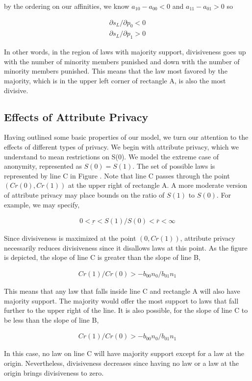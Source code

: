 by the ordering on our affinities, we know $a_{10} - a_{00}  < 0$ and $a_{11} - a_{01} > 0$ so

\begin{align}
\partial s_L / \partial p_0 <0 \\
\partial s_L / \partial p_1 >0
\end{align}

In other words, in the region of laws with majority support, divisiveness goes up with the number of minority members punished and down with the number of minority members punished.  This means that the law most favored by the majority, which is in the upper left corner of rectangle A, is also the most divisive.

\subsection{Effects of Attribute Privacy}

Having outlined some basic properties of our model, we turn our attention to the effects of different types of privacy.  We begin with attribute privacy, which we understand to mean restrictions on S(0).  We model the extreme case of anonymity, represented as $S(0) = S(1)$.  The set of possible laws is represented by line C in Figure .  Note that line C passes through the point $ \left(Cr(0), Cr(1) \right)$ at the upper right of rectangle A.  A more moderate version of attribute privacy may place bounds on the ratio of $S(1)$ to $S(0)$.  For example, we may specify,

\begin{align}
0 < \underbar r < S(1) /S(0) < \bar r < \infty
\end{align}

Since divisiveness is maximized at the point $ \left(0, Cr(1) \right)$, attribute privacy necessarily reduces divisiveness since it disallows laws at this point.  As the figure is depicted, the slope of line C is greater than the slope of line B, 

\begin{align}
Cr(1)/Cr(0) > - b_{00}n_0 / b_{01}n_1 
\end{align}

This means that any law that falls inside line C and rectangle A will also have majority support.  The majority would offer the most support to laws that fall further to the upper right of the line.  It is also possible, for the slope of line C to be less than the slope of line B,

\begin{align}
Cr(1)/Cr(0) > - b_{00}n_0 / b_{01}n_1 
\end{align}

In this case, no law on line C will have majority support except for a law at the origin.  Nevertheless, divisiveness decreases since having no law or a law at the origin brings divisiveness to zero.


